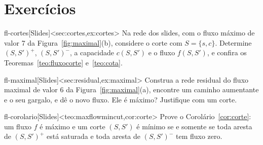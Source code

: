 \section{Exercícios}
\excurso
\begin{exercicio}{fl-cortes}[Slides]<sec:cortes,ex:cortes>
Na rede dos slides, com o fluxo máximo de valor 7 da Figura~\ref{fig:maximal}(b), considere o corte com $S=\{s,c\}$. Determine $(S,S')^+$, $(S,S')^-$, a capacidade $c(S,S')$ e o fluxo $f(S,S')$, e confira os Teoremas~\ref{teo:fluxocorte} e~\ref{teo:cota}.
\end{exercicio}
\begin{exercicio}{fl-maximal}[Slides]<sec:residual,ex:maximal>
Construa a rede residual do fluxo maximal de valor 6 da Figura~\ref{fig:maximal}(a), encontre um caminho aumentante e o seu gargalo, e dê o novo fluxo. Ele é máximo? Justifique com um corte.
\end{exercicio}
\begin{exercicio}{fl-corolario}[Slides]<teo:maxflowmincut,cor:corte>
Prove o Corolário~\ref{cor:corte}: um fluxo $f$ é máximo e um corte $(S,S')$ é mínimo se e somente se toda aresta de $(S,S')^+$ está saturada e toda aresta de $(S,S')^-$ tem fluxo zero.
\end{exercicio}

